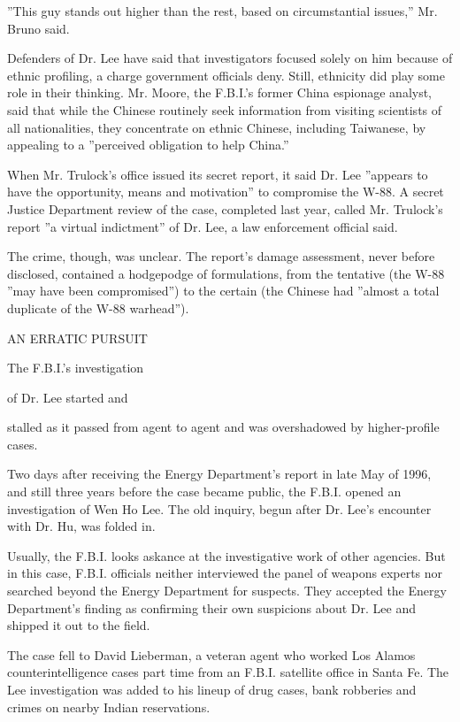 ''This guy stands out higher than the rest, based on circumstantial
issues,'' Mr. Bruno said.

Defenders of Dr. Lee have said that investigators focused solely on him
because of ethnic profiling, a charge government officials deny. Still,
ethnicity did play some role in their thinking. Mr. Moore, the F.B.I.'s
former China espionage analyst, said that while the Chinese routinely
seek information from visiting scientists of all nationalities, they
concentrate on ethnic Chinese, including Taiwanese, by appealing to a
''perceived obligation to help China.''

When Mr. Trulock's office issued its secret report, it said Dr. Lee
''appears to have the opportunity, means and motivation'' to compromise
the W-88. A secret Justice Department review of the case, completed last
year, called Mr. Trulock's report ''a virtual indictment'' of Dr. Lee, a
law enforcement official said.

The crime, though, was unclear. The report's damage assessment, never
before disclosed, contained a hodgepodge of formulations, from the
tentative (the W-88 ''may have been compromised'') to the certain (the
Chinese had ''almost a total duplicate of the W-88 warhead'').

AN ERRATIC PURSUIT

The F.B.I.'s investigation

of Dr. Lee started and

stalled as it passed from agent to agent and was overshadowed by
higher-profile cases.

Two days after receiving the Energy Department's report in late May of
1996, and still three years before the case became public, the F.B.I.
opened an investigation of Wen Ho Lee. The old inquiry, begun after Dr.
Lee's encounter with Dr. Hu, was folded in.

Usually, the F.B.I. looks askance at the investigative work of other
agencies. But in this case, F.B.I. officials neither interviewed the
panel of weapons experts nor searched beyond the Energy Department for
suspects. They accepted the Energy Department's finding as confirming
their own suspicions about Dr. Lee and shipped it out to the field.

The case fell to David Lieberman, a veteran agent who worked Los Alamos
counterintelligence cases part time from an F.B.I. satellite office in
Santa Fe. The Lee investigation was added to his lineup of drug cases,
bank robberies and crimes on nearby Indian reservations.

